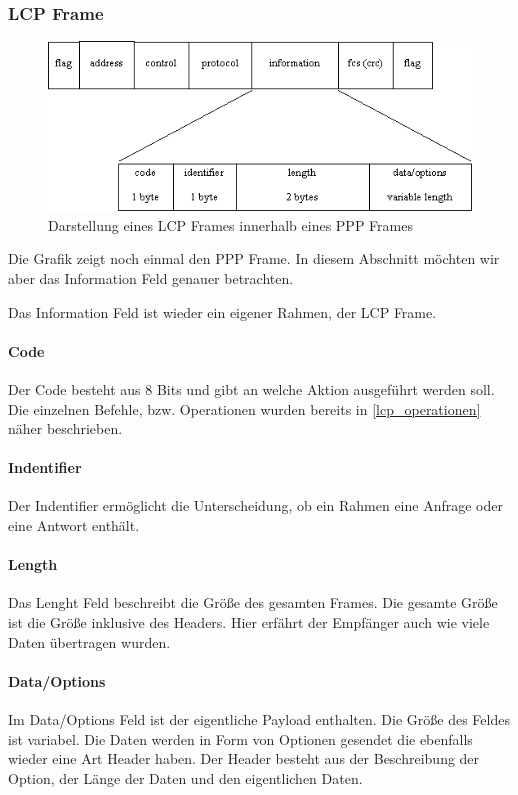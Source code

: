 \documentclass[12pt, a4paper, ngerman]{article}
\begin{document}
\subsubsection{LCP Frame}
\begin{figure}[H]
	\centering
	\includegraphics[width=1\textwidth]{Grafiken/lcp-header.jpg}	
	\caption{Darstellung eines LCP Frames innerhalb eines PPP Frames\cite{ppp-lcp-info.header}}
\end{figure}
Die Grafik zeigt noch einmal den PPP Frame. In diesem Abschnitt möchten wir aber das Information Feld genauer betrachten.

Das Information Feld ist wieder ein eigener Rahmen, der LCP Frame. 
\paragraph{Code}
Der Code besteht aus 8 Bits und gibt an welche Aktion ausgeführt werden soll. Die einzelnen Befehle, bzw. Operationen wurden bereits in  \ref{lcp_operationen} näher beschrieben.

\paragraph{Indentifier}
Der Indentifier ermöglicht die Unterscheidung, ob ein Rahmen eine Anfrage oder eine  Antwort enthält.

\paragraph{Length}
Das Lenght Feld beschreibt die Größe des gesamten Frames. Die gesamte Größe ist die Größe inklusive des Headers. Hier erfährt der Empfänger auch wie viele Daten übertragen wurden.
\paragraph{Data/Options}
Im Data/Options Feld ist der eigentliche Payload enthalten. Die Größe des Feldes ist variabel. Die Daten werden in Form von Optionen gesendet die ebenfalls wieder eine Art Header haben. Der Header besteht aus der Beschreibung der Option, der Länge der Daten und den eigentlichen Daten.
\end{document}
